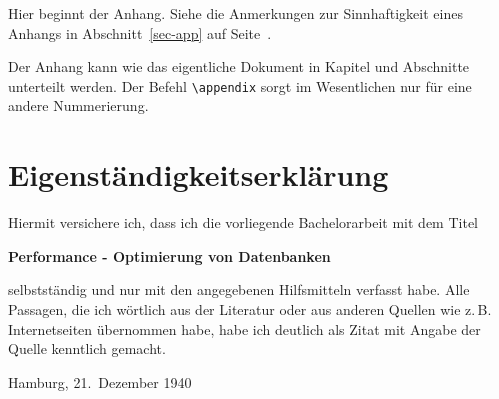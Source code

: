 
\printbibliography

\appendix


Hier beginnt der Anhang.  Siehe die Anmerkungen zur Sinnhaftigkeit eines
Anhangs in Abschnitt~\ref{sec-app} auf Seite~\pageref{sec-app}.

Der Anhang kann wie das eigentliche Dokument in Kapitel und Abschnitte
unterteilt werden.  Der Befehl \verb|\appendix| sorgt im Wesentlichen nur für
eine andere Nummerierung.

\clearpage

\thispagestyle{empty}

\section*{Eigenständigkeitserklärung}

Hiermit versichere ich, dass ich die vorliegende Bachelorarbeit mit dem Titel
\begin{center}
  \textbf{Performance - Optimierung von Datenbanken}
\end{center}
selbstständig und nur mit den angegebenen Hilfsmitteln verfasst habe.  Alle
Passagen, die ich wörtlich aus der Literatur oder aus anderen Quellen wie
z.\,B. Internetseiten übernommen habe, habe ich deutlich als Zitat mit Angabe
der Quelle kenntlich gemacht.

\vspace{2cm}
Hamburg, 21.\ Dezember 1940
